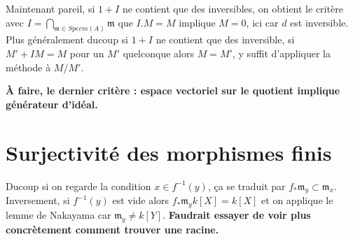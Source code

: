 \documentclass[a4paper,12pt]{book}
\newcommand{\m}{\mathfrak{m}}
\theoremstyle{plain}
\theoremstyle{definition}
\theoremstyle{remark}
\begin{document}
Maintenant pareil, si $1+I$ ne contient que des inversibles, on obtient
le critère avec $I=\bigcap_{\m\in Specm(A)} \m$ que $I.M=M$ implique
$M=0$, ici car $d$ est inversible. Plus généralement ducoup si $1+I$
ne contient que des inversible, si $M'+IM=M$ pour un $M'$ quelconque 
alors $M=M'$, y suffit d'appliquer la méthode à $M/M'$.

\textbf{À faire, le dernier critère : espace vectoriel sur le quotient
implique générateur d'idéal.}

\section{Surjectivité des morphismes finis}
Ducoup si on regarde la condition $x\in f^{-1}(y)$, ça se traduit par
$f_*\m_y\subset \m_x$. Inversement, si $f^{-1}(y)$ est vide alors
$f_*\m_yk[X]=k[X]$ et on applique le lemme de Nakayama car 
$\m_y\ne k[Y]$. \textbf{Faudrait essayer de voir plus concrètement
comment trouver une racine.}


\printbibliography
\end{document}
